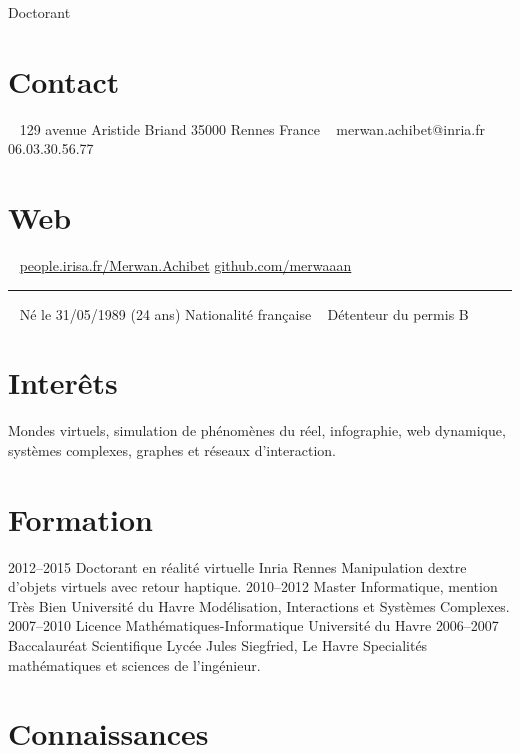 \documentclass[]{friggeri-cv}
\begin{document}
       {Doctorant}

\begin{aside}
  \section{Contact}
    ~
    129 avenue Aristide Briand
    35000 Rennes
    France
    ~
    merwan.achibet@inria.fr
    ~
    06.03.30.56.77
  \section{Web}
    ~
    \href{http://people.irisa.fr/Merwan.Achibet/}{people.irisa.fr/Merwan.Achibet}
    \href{http://github.com/merwaaan}{github.com/merwaaan}
    ~
    {\color{lightergray}\rule{3cm}{0.01cm}}
    ~
    Né le 31/05/1989 (24 ans)
    Nationalité française
    ~
    Détenteur du permis B
\end{aside}

\section{Interêts}

Mondes virtuels, simulation de phénomènes du réel, infographie, web dynamique, systèmes complexes, graphes et réseaux d'interaction.

\section{Formation}

\begin{entrylist}
  \entry
    {2012–2015}
    {Doctorant en réalité virtuelle}
    {Inria Rennes}
    {Manipulation dextre d’objets virtuels avec retour haptique.}
  \entry
    {2010–2012}
    {Master Informatique, mention Très Bien}
    {Université du Havre}
    {Modélisation, Interactions et Systèmes Complexes.}
  \entry
    {2007–2010}
    {Licence Mathématiques-Informatique}
    {Université du Havre}
    {}
  \entry
    {2006–2007}
    {Baccalauréat Scientifique}
    {Lycée Jules Siegfried, Le Havre}
    {Specialités mathématiques et sciences de l'ingénieur.}
\end{entrylist}

\section{Connaissances}
\end{document}
